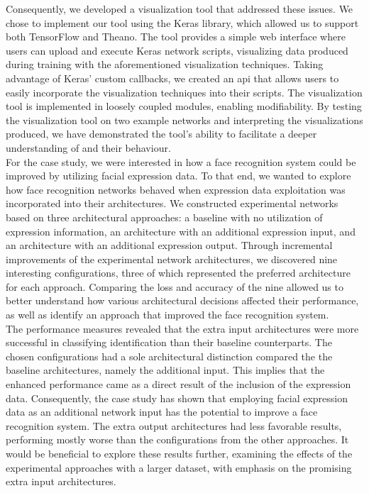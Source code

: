 \noindent Consequently, we developed a visualization tool that addressed these issues. We chose to implement our tool using the Keras library, which allowed us to support both TensorFlow and Theano. The tool provides a simple web interface where users can upload and execute Keras network scripts, visualizing data produced during training with the aforementioned visualization techniques. Taking advantage of Keras' custom callbacks, we created an \acrshort{api} that allows users to easily incorporate the visualization techniques into their scripts. The visualization tool is implemented in loosely coupled modules, enabling modifiability. By testing the visualization tool on two example networks and interpreting the visualizations produced, we have demonstrated the tool's ability to facilitate a deeper understanding of  and their behaviour. \\

\noindent For the case study, we were interested in how a face recognition system could be improved by utilizing facial expression data. To that end, we wanted to explore how face recognition networks behaved when expression data exploitation was incorporated into their architectures. We constructed experimental networks based on three architectural approaches: a baseline with no utilization of expression information, an architecture with an additional expression input, and an architecture with an additional expression output. Through incremental improvements of the experimental network architectures, we discovered nine interesting configurations, three of which represented the preferred architecture for each approach. Comparing the loss and accuracy of the nine allowed us to better understand how various architectural decisions affected their performance, as well as identify an approach that improved the face recognition system. \\

\noindent The performance measures revealed that the extra input architectures were more successful in classifying identification than their baseline counterparts. The chosen configurations had a sole architectural distinction compared the the baseline architectures, namely the additional input. This implies that the enhanced performance came as a direct result of the inclusion of the expression data. Consequently, the case study has shown that employing facial expression data as an additional network input has the potential to improve a face recognition system. The extra output architectures had less favorable results, performing mostly worse than the configurations from the other approaches. It would be beneficial to explore these results further, examining the effects of the experimental approaches with a larger dataset, with emphasis on the promising extra input architectures. \\

